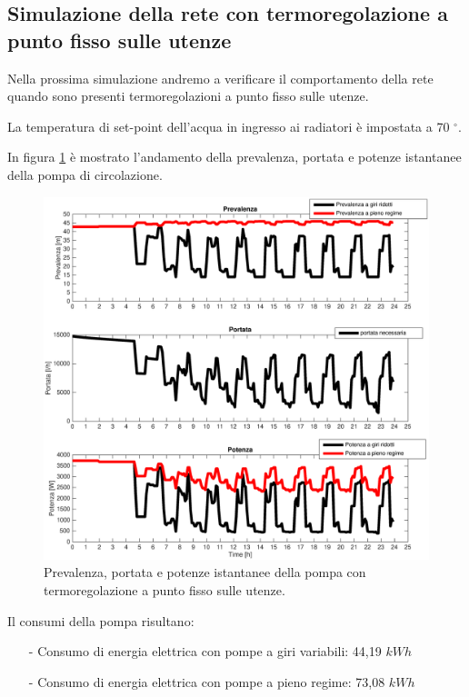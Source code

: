 \documentclass[laurea,oneside,11pt]{USiena_tesiLM}
\begin{document}
\subsection{Simulazione della rete con termoregolazione a punto fisso sulle utenze}
Nella prossima simulazione andremo a verificare il comportamento della rete quando sono presenti termoregolazioni a punto fisso sulle utenze. 

La temperatura di set-point dell'acqua in ingresso ai radiatori è impostata a 70 $^{\circ}$.

In figura \ref{fig:sim_regmandata} è mostrato l'andamento della prevalenza, portata e potenze istantanee della pompa di circolazione.

\begin{figure}[!ht]
\centering
\includegraphics[width=\textwidth]{figure/sim_regmandata} 
\caption{Prevalenza, portata e potenze istantanee della pompa con termoregolazione a punto fisso sulle utenze. }
\label{fig:sim_regmandata}
\end{figure}

Il consumi della pompa risultano:
\begin{itemize}
\item[-] Consumo di energia elettrica con pompe a giri variabili: 44,19 $kWh$ 
\item[-] Consumo di energia elettrica con pompe a pieno regime: 73,08 $kWh$
\end{itemize}
\end{document}
